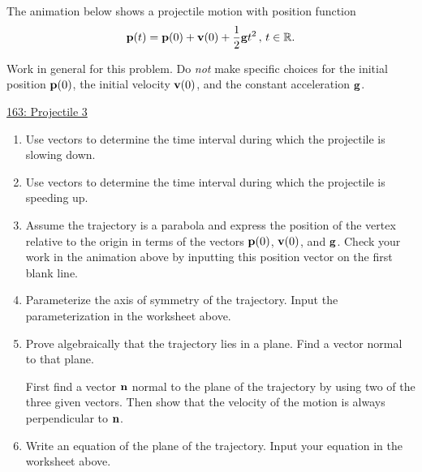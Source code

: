 \documentclass{ximera}
\begin{document}
\begin{question}  \label{Q454rft4t4t}
The animation below shows a projectile motion with position function
\[
    {\bf p}(t) = {\bf p}(0) + {\bf v}(0) + \frac{1}{2}{\bf g}t^2 \, , \, t \in \mathbb{R} .
\]

Work in general for this problem. Do \emph{not} make specific choices for the initial position ${\bf p}(0)$, the initial velocity ${\bf v}(0)$, and the constant acceleration ${\bf g}$. 

\begin{onlineOnly}
    \begin{center}
\end{center}
\end{onlineOnly}

\href{https://www.desmos.com/3d/clr4mdmltt}{163: Projectile 3}

\begin{enumerate}
\item Use vectors to determine the time interval during which the projectile is slowing down. 

\item Use vectors to determine the time interval during which the projectile is speeding up. 

\item Assume the trajectory is a parabola and express the position of the vertex relative to the origin in terms of the vectors ${\bf p}(0)$, ${\bf v}(0)$, and ${\bf g}$. Check  your work in the animation above by inputting this position vector on the first blank line.

\item Parameterize the axis of symmetry of the trajectory. Input the parameterization in the worksheet above.

\item Prove algebraically that the trajectory lies in a plane. Find a vector normal to that plane.

\begin{hint}
First find a vector ${\bf n}$ normal to the plane of the trajectory by using two of the three given vectors. Then show that the velocity of the motion is always perpendicular to ${\bf n}$.
\end{hint}


\item Write an equation of the plane of the trajectory. Input your equation in the worksheet above.

\end{enumerate}
\end{question}
\end{document}

